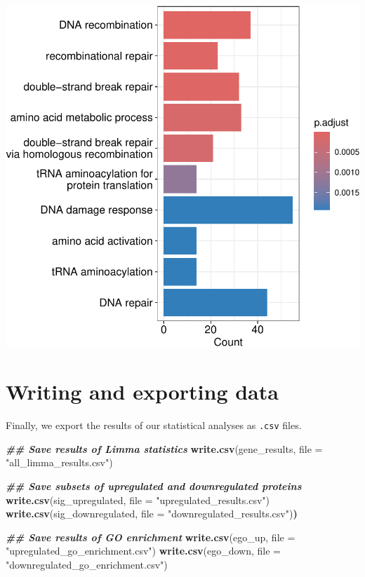 \documentclass[9pt,a4paper,]{extarticle}
\newenvironment{Shaded}{\begin{snugshade}}{\end{snugshade}}
\newcommand{\AttributeTok}[1]{\textcolor[rgb]{0.13,0.29,0.53}{#1}}
\newcommand{\DocumentationTok}[1]{\textcolor[rgb]{0.56,0.35,0.01}{\textbf{\textit{#1}}}}
\newcommand{\ErrorTok}[1]{\textcolor[rgb]{0.64,0.00,0.00}{\textbf{#1}}}
\newcommand{\FunctionTok}[1]{\textcolor[rgb]{0.13,0.29,0.53}{\textbf{#1}}}
\newcommand{\NormalTok}[1]{#1}
\newcommand{\StringTok}[1]{\textcolor[rgb]{0.31,0.60,0.02}{#1}}
\begin{document}
\begin{center}\includegraphics[height=0.4\textheight]{workflow_expressions_files/figure-latex/GO_enrichment_plot-1} \end{center}

\section{Writing and exporting data}\label{writing-and-exporting-data}

Finally, we export the results of our statistical analyses as \texttt{.csv} files.

\begin{Shaded}
\begin{Highlighting}[]
\DocumentationTok{\#\# Save results of Limma statistics}
\FunctionTok{write.csv}\NormalTok{(gene\_results, }\AttributeTok{file =} \StringTok{"all\_limma\_results.csv"}\NormalTok{)}

\DocumentationTok{\#\# Save subsets of upregulated and downregulated proteins}
\FunctionTok{write.csv}\NormalTok{(sig\_upregulated, }\AttributeTok{file =} \StringTok{"upregulated\_results.csv"}\NormalTok{)}
\FunctionTok{write.csv}\NormalTok{(sig\_downregulated, }\AttributeTok{file =} \StringTok{"downregulated\_results.csv"}\NormalTok{)}\ErrorTok{)}

\DocumentationTok{\#\# Save results of GO enrichment}
\FunctionTok{write.csv}\NormalTok{(ego\_up, }\AttributeTok{file =} \StringTok{"upregulated\_go\_enrichment.csv"}\NormalTok{)}
\FunctionTok{write.csv}\NormalTok{(ego\_down, }\AttributeTok{file =} \StringTok{"downregulated\_go\_enrichment.csv"}\NormalTok{)}
\end{Highlighting}
\end{Shaded}
\end{document}
